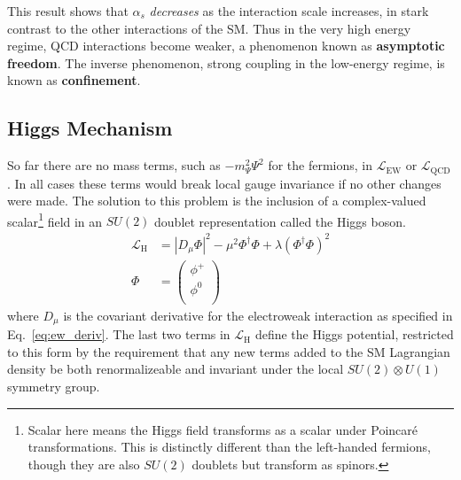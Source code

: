 This result shows that $\alpha_s$ \textit{decreases} as the interaction scale increases, in stark contrast to the other interactions of the SM.
Thus in the very high energy regime, QCD interactions become weaker, a phenomenon known as \textbf{asymptotic freedom}. %
The inverse phenomenon, strong coupling in the low-energy regime, is known as \textbf{confinement}.

\subsection{Higgs Mechanism}
So far there are no mass terms, such as $-m_\Psi^2 \Psi^2$ for the fermions, in $\mathcal{L}_{\mathrm{EW}}$ or $\mathcal{L}_{\mathrm{QCD}}$.
In all cases these terms would break local gauge invariance if no other changes were made.
The solution to this problem is the inclusion of a complex-valued scalar\footnote{Scalar here means the Higgs field transforms as a scalar under Poincar\'{e} transformations. This is distinctly different than the left-handed fermions, though they are also $SU(2)$ doublets but transform as spinors.} field in an $SU(2)$ doublet representation called the Higgs boson.
\begin{align}
    \mathcal{L}_{\mathrm{H}} &= \left|D_\mu \Phi\right|^2 - \mu^2 \Phi^\dag \Phi + \lambda \left(\Phi^\dag \Phi \right)^2 \\
    \Phi &= 
    \begin{pmatrix}
    \phi^+ \\
    \phi^0 \\
    \end{pmatrix}
\end{align}
where $D_\mu$ is the covariant derivative for the electroweak interaction as specified in Eq.~\ref{eq:ew_deriv}.
The last two terms in $\mathcal{L}_{\mathrm{H}}$ define the Higgs potential, restricted to this form by the requirement that any new terms added to the SM Lagrangian density be both renormalizeable and invariant under the local $SU(2) \otimes U(1)$ symmetry group.


